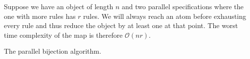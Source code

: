 Suppose we have an object of length $n$ and two parallel specifications where the one with more rules has $r$ rules. We will always reach an atom before exhausting every rule and thus reduce the object by at least one at that point. The worst time complexity of the map is therefore $\mathcal{O}(nr)$.

\begin{algorithm}[ht!]

\caption{The parallel bijection algorithm.}
\label{alg:parmap}
\end{algorithm}